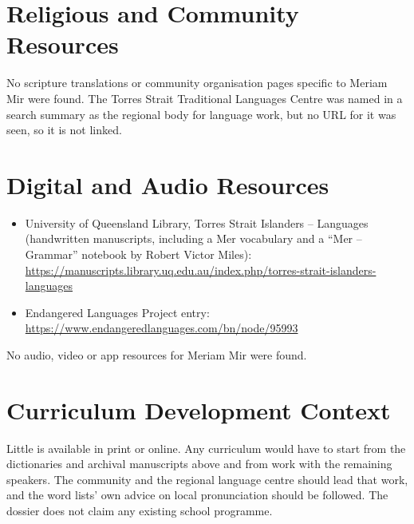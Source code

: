 \documentclass[12pt]{article}
\begin{document}
\section{Religious and Community Resources}
No scripture translations or community organisation pages specific to Meriam Mir were found. The Torres Strait Traditional Languages Centre was named in a search summary as the regional body for language work, but no URL for it was seen, so it is not linked.

\section{Digital and Audio Resources}
\begin{itemize}
\item University of Queensland Library, Torres Strait Islanders -- Languages (handwritten manuscripts, including a Mer vocabulary and a ``Mer -- Grammar'' notebook by Robert Victor Miles): \url{https://manuscripts.library.uq.edu.au/index.php/torres-strait-islanders-languages}
\item Endangered Languages Project entry: \url{https://www.endangeredlanguages.com/bn/node/95993}
\end{itemize}
No audio, video or app resources for Meriam Mir were found.

\section{Curriculum Development Context}
Little is available in print or online. Any curriculum would have to start from the dictionaries and archival manuscripts above and from work with the remaining speakers. The community and the regional language centre should lead that work, and the word lists' own advice on local pronunciation should be followed. The dossier does not claim any existing school programme.
\end{document}
